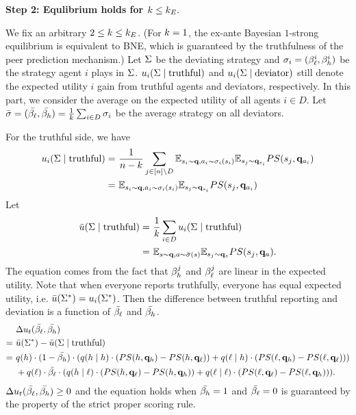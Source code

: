\noindent\textbf{Step 2: Equlibrium holds for $k \le k_E.$}

We fix an arbitrary $2\le k \le k_E$. (For $k = 1$, the ex-ante Bayesian $1$-strong equilibrium is equivalent to BNE, which is guaranteed by the truthfulness of the peer prediction mechanism.) Let $\Sigma$ be the deviating strategy and $\sigma_i = (\beta_{\ell}^i, \beta_{h}^i)$ be the strategy agent $i$ plays in $\Sigma$. $u_i(\Sigma \mid \text{truthful})$ and $u_i(\Sigma \mid \text{deviator})$ still denote the expected utility $i$ gain from truthful agents and deviators, respectively. In this part, we consider the average on the expected utility of all agents $i \in D$. Let $\bar{\sigma} = (\bar{\beta_{\ell}}, \bar{\beta_{h}}) = \frac{1}{k} \sum_{i \in D} \sigma_i$ be the average strategy on all deviators. 

For the truthful side, we have 
\begin{align*}
    u_i(\Sigma \mid \text{truthful}) =&\  \frac{1}{n-k}\sum_{j \in [n]\setminus D} \mathbb{E}_{s_i \sim \mathbf{q}
    , a_i \sim \sigma_i(s_i)} \mathbb{E}_{s_j \sim \mathbf{q}_{s_i}} PS(s_j, \mathbf{q}_{a_i})\\
    =&\ \mathbb{E}_{s_i \sim \mathbf{q}
    , a_i \sim \sigma_i(s_i)} \mathbb{E}_{s_j \sim \mathbf{q}_{s_i}} PS(s_j, \mathbf{q}_{a_i})
\end{align*}
Let
\begin{align*}
    \bar{u}(\Sigma\mid\text{truthful}) =&\ \frac{1}{k} \sum_{i \in D}  u_i(\Sigma\mid\text{truthful})\\
    =&\ \mathbb{E}_{s \sim \mathbf{q}
    , a \sim \bar{\sigma}(s)} \mathbb{E}_{s_j \sim \mathbf{q}_{s}} PS(s_j, \mathbf{q}_{a}). 
\end{align*}
The equation comes from the fact that $\beta_{h}^j$ and $\beta_{\ell}^j$ are linear in the expected utility. Note that when everyone reports truthfully, everyone has equal expected utility, i.e. $\bar{u}(\Sigma^*) = u_i(\Sigma^*)$.  Then the difference between truthful reporting and deviation is a function of $\bar{\beta_{\ell}}$ and $\bar{\beta_{h}}$.
\begin{align*}
    &\ \Delta u_t (\bar{\beta_{\ell}}, \bar{\beta_{h}})\\ =&\ \bar{u}(\Sigma^*) - \bar{u}(\Sigma \mid \text{truthful})\\
    =&\ q(h) \cdot (1 - \bar{\beta_{h}}) \cdot (q(h\mid h) \cdot (PS(h, \mathbf{q}_h) - PS(h, \mathbf{q}_{\ell}))  + q(\ell \mid h) \cdot (PS(\ell, \mathbf{q}_h) - PS(\ell, \mathbf{q}_\ell)))\\
    &\ +  q(\ell) \cdot \bar{\beta_{\ell}} \cdot (q(h\mid \ell) \cdot (PS(h, \mathbf{q}_\ell) - PS(h, \mathbf{q}_{h})) + q(\ell \mid \ell) \cdot (PS(\ell, \mathbf{q}_\ell) - PS(\ell, \mathbf{q}_h))).
\end{align*}
$\Delta u_t (\bar{\beta_{\ell}}, \bar{\beta_{h}}) \ge 0$ and the equation holds when $\bar{\beta_{h}} = 1$ and $\bar{\beta_{\ell}} = 0$ is guaranteed by the property of the strict proper scoring rule. 

